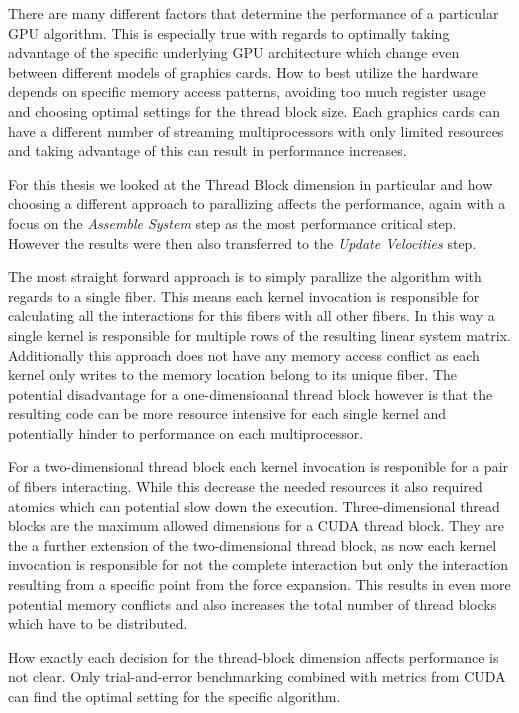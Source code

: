 \documentclass[a4paper,11pt]{kth-mag}
\begin{document}
There are many different factors that determine the performance of a particular GPU algorithm. This is especially true with regards to optimally taking advantage of the specific underlying GPU architecture which change even between different models of graphics cards. How to best utilize the hardware depends on specific memory access patterns, avoiding too much register usage and choosing optimal settings for the thread block size. Each graphics cards can have a different number of streaming multiprocessors with only limited resources and taking advantage of this can result in performance increases.

For this thesis we looked at the Thread Block dimension in particular and how choosing a different approach to parallizing affects the performance, again with a focus on the \emph{Assemble System} step as the most performance critical step. However the results were then also transferred to the \emph{Update Velocities} step.

The most straight forward approach is to simply parallize the algorithm with regards to a single fiber. This means each kernel invocation is responsible for calculating all the interactions for this fibers with all other fibers. In this way a single kernel is responsible for multiple rows of the resulting linear system matrix. Additionally this approach does not have any memory access conflict as each kernel only writes to the memory location belong to its unique fiber. The potential disadvantage for a one-dimensioanal thread block however is that the resulting code can be more resource intensive for each single kernel and potentially hinder to performance on each multiprocessor.

For a two-dimensional thread block each kernel invocation is responible for a pair of fibers interacting. While this decrease the needed resources it also required atomics which can potential slow down the execution. Three-dimensional thread blocks are the maximum allowed dimensions for a CUDA thread block. They are the a further extension of the two-dimensional thread block, as now each kernel invocation is responsible for not the complete interaction but only the interaction resulting from a specific point from the force expansion. This results in even more potential memory conflicts and also increases the total number of thread blocks which have to be distributed.

How exactly each decision for the thread-block dimension affects performance is not clear. Only trial-and-error benchmarking combined with metrics from CUDA can find the optimal setting for the specific algorithm.
\end{document}

